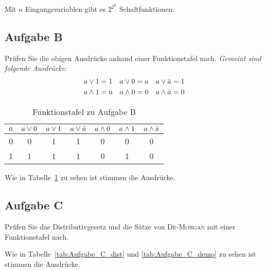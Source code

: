 Mit $n$ Eingangsvariablen gibt es $2^{2^n}$ Schaltfunktionen.

\FloatBarrier
\subsection{Aufgabe B}

\begin{problem}
    Prüfen Sie die obigen Ausdrücke anhand einer Funktionstafel nach.
    \textit{Gemeint sind folgende Ausdrücke:}
        \begin{align*}
            a \vee 1 &= 1 \quad a \vee 0 = a \quad a \vee \bar a = 1\\
            a \wedge 1 &= a \quad a \wedge 0 = 0 \quad a \wedge \bar a = 0
        \end{align*}
\end{problem}

\begin{table}[htbp]
    \centering
    \begin{tabular}{c|cccccc}
        $a$ & $a \vee 0$ & $a \vee 1$ & $a \vee \bar a$ & $a \wedge 0$ & $a
        \wedge 1$ & $a \wedge \bar a$ \\
        \hline
        0 & 0 & 1 & 1 & 0 & 0 & 0\\
        1 & 1 & 1 & 1 & 0 & 1 & 0
    \end{tabular}
    \caption{%
        Funktionstafel zu Aufgabe B
    }
    \label{tab:Aufgabe_B}
\end{table}

Wie in Tabelle~\ref{tab:Aufgabe_B} zu sehen ist stimmen die Ausdrücke.

\FloatBarrier
\subsection{Aufgabe C}

\begin{problem}
    Prüfen Sie das Distributivgesetz und die Sätze von \textsc{De-Morgan} mit einer
    Funktionstafel nach.
\end{problem}

Wie in Tabelle~\ref{tab:Aufgabe_C_dist} und \ref{tab:Aufgabe_C_demo} zu sehen
ist stimmen die Ausdrücke.

